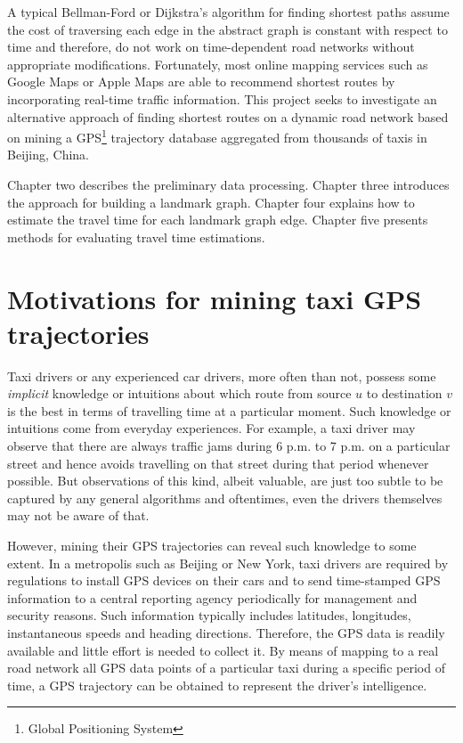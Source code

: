 A typical Bellman-Ford\cite{CLRS09} or Dijkstra's algorithm\cite{Dij59} for finding shortest paths assume the cost of traversing each edge in the abstract graph is constant with respect to time and therefore, do not work on time-de\-pendent road networks without appropriate modifications. Fortunately, most online mapping services such as Google Maps or Apple Maps are able to recommend shortest routes by incorporating real-time traffic information. This project seeks to investigate an alternative approach of finding shortest routes on a dynamic road network based on mining a GPS\footnote{Global Positioning System} trajectory database aggregated from thousands of taxis in Beijing, China.

Chapter two describes the preliminary data processing. Chapter three introduces the approach for building a landmark graph. Chapter four explains how to estimate the travel time for each landmark graph edge. Chapter five presents methods for evaluating travel time estimations. 

\section{Motivations for mining taxi GPS trajectories}
Taxi drivers or any experienced car drivers, more often than not, possess some \emph{implicit} knowledge or intuitions about which route from source $u$ to destination $v$ is the best in terms of travelling time at a particular moment. Such knowledge or intuitions come from everyday experiences. For example, a taxi driver may observe that there are always traffic jams during 6 p.m. to 7 p.m. on a particular street and hence avoids travelling on that street during that period whenever possible. But observations of this kind, albeit valuable, are just too subtle to be captured by any general algorithms and oftentimes, even the drivers themselves may not be aware of that.

However, mining their GPS trajectories can reveal such knowledge to some extent. In a metropolis such as Beijing or New York, taxi drivers are required by regulations to install GPS devices on their cars and to send time-stamped GPS information to a central reporting agency periodically for management and security reasons. Such information typically includes latitudes, longitudes, instantaneous speeds and heading directions. Therefore, the GPS data is readily available and little effort is needed to collect it. By means of mapping to a real road network all GPS data points of a particular taxi during a specific period of time, a GPS trajectory can be obtained to represent the driver's intelligence. 

